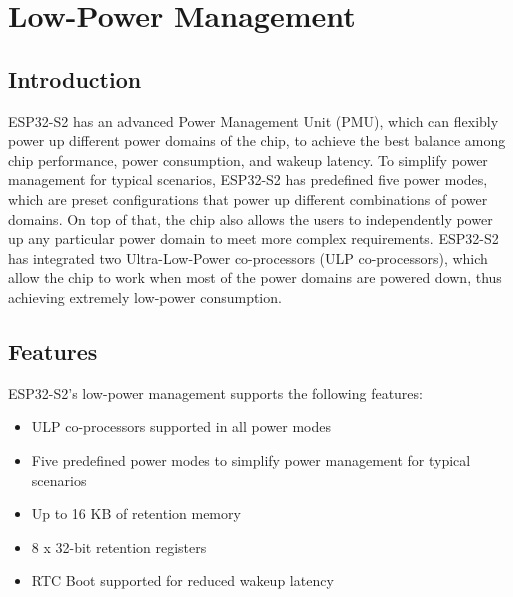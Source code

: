 \documentclass[main\_\_EN.tex]{subfiles}
\begin{document}
\setenglishformatting

\ifglobal
\else
    \listoftodos
    {\let\clearpage\relax \listofdonetodos}
    \tableofcontents
\fi




\hypertarget{lowpowm}{}
\chapter{Low-Power Management}
\label{mod:lowpowm}

\section{Introduction}

ESP32-S2 has an advanced Power Management Unit (PMU), which can flexibly power up different power domains of the chip, to achieve the best balance among chip performance, power consumption, and wakeup latency. To simplify power management for typical scenarios, ESP32-S2 has predefined five power modes, which are preset configurations that power up different combinations of power domains. On top of that, the chip also allows the users to independently power up any particular power domain to meet more complex requirements. ESP32-S2 has integrated two Ultra-Low-Power co-processors (ULP co-processors), which allow the chip to work when most of the power domains are powered down, thus achieving extremely low-power consumption.

\section{Features}
ESP32-S2's low-power management supports the following features:
\begin{itemize}
    \item ULP co-processors supported in all power modes
    \item Five predefined power modes to simplify power management for typical scenarios
    \item Up to 16 KB of retention memory
    \item 8 x 32-bit retention registers
    \item RTC Boot supported for reduced wakeup latency
\end{itemize}
\end{document}
